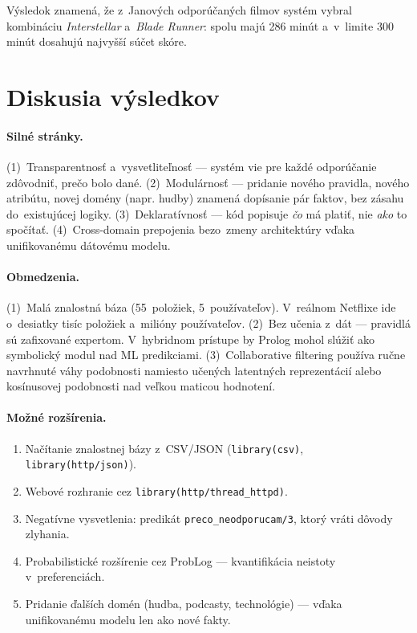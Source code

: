 \documentclass[11pt,a4paper]{article}
\begin{document}
\noindent
Výsledok znamená, že z~Janových odporúčaných filmov systém vybral
kombináciu \emph{Interstellar} a~\emph{Blade Runner}: spolu majú 286 minút
a~v~limite 300 minút dosahujú najvyšší súčet skóre.

\section{Diskusia výsledkov}

\paragraph{Silné stránky.} (1)~Transparentnosť a~vysvetliteľnosť ---
systém vie pre každé odporúčanie zdôvodniť, prečo bolo dané.
(2)~Modulárnosť --- pridanie nového pravidla, nového atribútu,
novej domény (napr. hudby) znamená dopísanie pár faktov, bez
zásahu do~existujúcej logiky. (3)~Deklaratívnosť --- kód
popisuje \emph{čo} má platiť, nie \emph{ako} to spočítať.
(4)~Cross-domain prepojenia bezo~zmeny architektúry vďaka
unifikovanému dátovému modelu.

\paragraph{Obmedzenia.} (1)~Malá znalostná báza
(55~položiek, 5~používateľov). V~reálnom Netflixe ide
o~desiatky tisíc položiek a~milióny používateľov.
(2)~Bez učenia z~dát --- pravidlá sú zafixované expertom.
V~hybridnom prístupe by Prolog mohol slúžiť ako symbolický
modul nad ML predikciami. (3)~Collaborative filtering používa
ručne navrhnuté váhy podobnosti namiesto učených latentných
reprezentácií alebo kosínusovej podobnosti nad veľkou maticou
hodnotení.

\paragraph{Možné rozšírenia.}
\begin{enumerate}[noitemsep]
  \item Načítanie znalostnej bázy z~CSV/JSON
        (\texttt{library(csv)}, \texttt{library(http/json)}).
  \item Webové rozhranie cez \texttt{library(http/thread\_httpd)}.
  \item Negatívne vysvetlenia: predikát
        \texttt{preco\_neodporucam/3}, ktorý vráti dôvody zlyhania.
  \item Probabilistické rozšírenie cez ProbLog ---
        kvantifikácia neistoty v~preferenciách.
  \item Pridanie ďalších domén (hudba, podcasty, technológie)
        --- vďaka unifikovanému modelu len ako nové fakty.
\end{enumerate}
\end{document}

